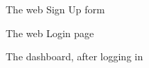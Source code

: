 \documentclass[english]{article}
\begin{document}
\begin{figure}[H]
	\centering
	\caption{The web Sign Up form}
\end{figure}
\begin{figure}[H]
	\centering
	\caption{The web Login page}
\end{figure}
\begin{figure}[H]
	\centering
	\caption{The dashboard, after logging in}
\end{figure}
\end{document}
